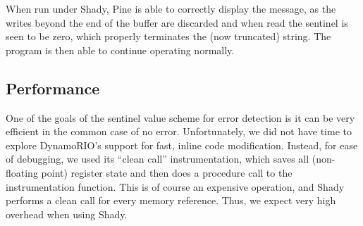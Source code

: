 \documentclass{article}
\newcommand{\code}[1]{\texttt{#1}}
\begin{document}
When run under Shady, Pine is able to correctly display the message, as the writes beyond the end of the buffer are discarded and when read the sentinel is seen to be zero, which properly terminates the (now truncated) string.  The program is then able to continue operating normally.



\subsection{Performance}

One of the goals of the sentinel value scheme for error detection is it can be very efficient in the common case of no error. Unfortunately, we did not have time to explore DynamoRIO's support for fast, inline code modification. Instead, for ease of debugging, we used its ``clean call'' instrumentation, which saves all (non-floating point) register state and then does a procedure call to the instrumentation function. This is of course an expensive operation, and Shady performs a clean call for every memory reference. Thus, we expect very high overhead when using Shady.
\end{document}
